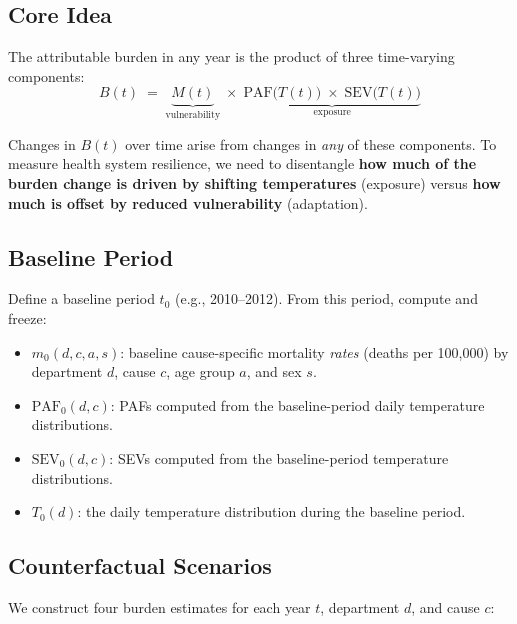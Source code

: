 \documentclass[11pt,a4paper]{article}
\begin{document}
\subsection{Core Idea}

The attributable burden in any year is the product of three time-varying components:
\begin{equation}
  B(t) \;=\; \underbrace{M(t)}_{\text{vulnerability}} \;\times\; \underbrace{\text{PAF}\bigl(T(t)\bigr) \;\times\; \text{SEV}\bigl(T(t)\bigr)}_{\text{exposure}}
  \label{eq:decomp}
\end{equation}

Changes in $B(t)$ over time arise from changes in \emph{any} of these components. To measure health system resilience, we need to disentangle \textbf{how much of the burden change is driven by shifting temperatures} (exposure) versus \textbf{how much is offset by reduced vulnerability} (adaptation).

\subsection{Baseline Period}

Define a baseline period $t_0$ (e.g., 2010--2012). From this period, compute and freeze:
\begin{itemize}[nosep]
  \item $m_0(d,c,a,s)$: baseline cause-specific mortality \emph{rates} (deaths per 100,000) by department $d$, cause $c$, age group $a$, and sex $s$.
  \item $\text{PAF}_0(d,c)$: PAFs computed from the baseline-period daily temperature distributions.
  \item $\text{SEV}_0(d,c)$: SEVs computed from the baseline-period temperature distributions.
  \item $T_0(d)$: the daily temperature distribution during the baseline period.
\end{itemize}

\subsection{Counterfactual Scenarios}

We construct four burden estimates for each year $t$, department $d$, and cause $c$:

\medskip
\end{document}
